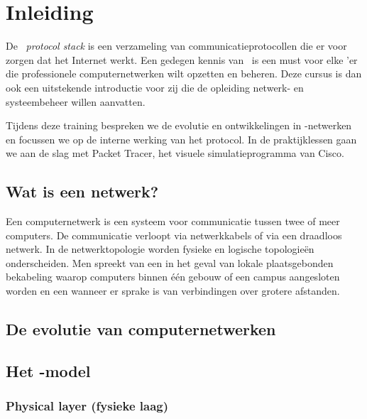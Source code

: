 \chapter{Inleiding}
\label{chap:inleiding}

De \TCPIP\ \emph{protocol stack} is een verzameling van communicatieprotocollen die er voor zorgen dat het Internet werkt.
Een gedegen kennis van \TCPIP\ is een must voor elke 'er die professionele computernetwerken wilt opzetten en beheren.
Deze cursus is dan ook een uitstekende introductie voor zij die de opleiding netwerk- en systeembeheer willen aanvatten.

Tijdens%
deze training bespreken we de evolutie en ontwikkelingen in \TCPIP-netwerken en focussen we op de interne werking van het protocol.
In de praktijklessen gaan we aan de slag met Packet Tracer,
het visuele simulatieprogramma van Cisco.

\section{Wat is een netwerk?}

Een computernetwerk is een systeem voor communicatie tussen twee of meer computers.
De communicatie verloopt via netwerkkabels of via een draadloos netwerk.
In de netwerktopologie worden fysieke en logische topologieën onderscheiden.
Men spreekt van een  in het geval van lokale plaatsgebonden bekabeling waarop computers binnen één gebouw of een campus aangesloten worden en een  wanneer er sprake is van verbindingen over grotere afstanden.




\section{De evolutie van computernetwerken}








\section{Het -model}


\subsection{Physical layer (fysieke laag)}


